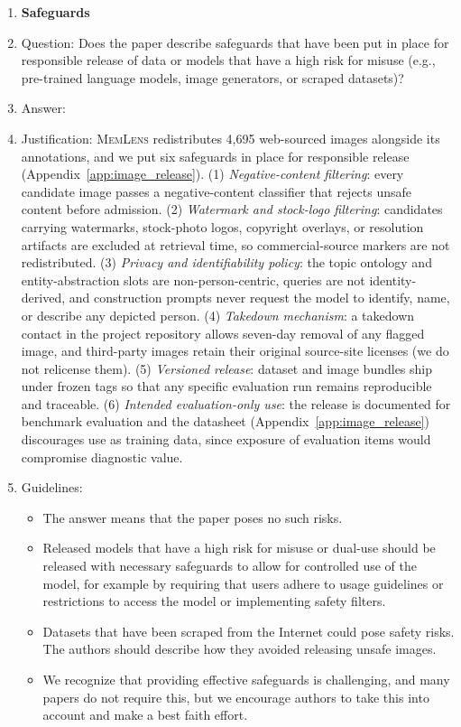 \documentclass{article}
\newcommand{\bench}{\textsc{MemLens}}
\begin{document}
\begin{enumerate}
\item {\bf Safeguards}
    \item[] Question: Does the paper describe safeguards that have been put in place for responsible release of data or models that have a high risk for misuse (e.g., pre-trained language models, image generators, or scraped datasets)?
    \item[] Answer: \answerYes{}
    \item[] Justification: \bench{} redistributes 4{,}695 web-sourced images alongside its annotations, and we put six safeguards in place for responsible release (Appendix~\ref{app:image_release}). (1) \emph{Negative-content filtering}: every candidate image passes a negative-content classifier that rejects unsafe content before admission. (2) \emph{Watermark and stock-logo filtering}: candidates carrying watermarks, stock-photo logos, copyright overlays, or resolution artifacts are excluded at retrieval time, so commercial-source markers are not redistributed. (3) \emph{Privacy and identifiability policy}: the topic ontology and entity-abstraction slots are non-person-centric, queries are not identity-derived, and construction prompts never request the model to identify, name, or describe any depicted person. (4) \emph{Takedown mechanism}: a takedown contact in the project repository allows seven-day removal of any flagged image, and third-party images retain their original source-site licenses (we do not relicense them). (5) \emph{Versioned release}: dataset and image bundles ship under frozen tags so that any specific evaluation run remains reproducible and traceable. (6) \emph{Intended evaluation-only use}: the release is documented for benchmark evaluation and the datasheet (Appendix~\ref{app:image_release}) discourages use as training data, since exposure of evaluation items would compromise diagnostic value.
    \item[] Guidelines:
    \begin{itemize}
        \item The answer \answerNA{} means that the paper poses no such risks.
        \item Released models that have a high risk for misuse or dual-use should be released with necessary safeguards to allow for controlled use of the model, for example by requiring that users adhere to usage guidelines or restrictions to access the model or implementing safety filters.
        \item Datasets that have been scraped from the Internet could pose safety risks. The authors should describe how they avoided releasing unsafe images.
        \item We recognize that providing effective safeguards is challenging, and many papers do not require this, but we encourage authors to take this into account and make a best faith effort.
    \end{itemize}


\end{enumerate}
\end{document}
